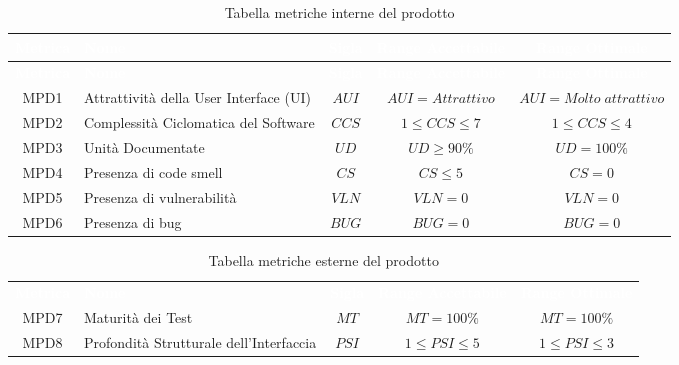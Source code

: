 \renewcommand{\arraystretch}{1.5}
\begin{longtable}{ c C{4cm} c c c}
\caption{Tabella metriche interne del prodotto}\\
\textcolor{white}{\textbf{Metrica}} & \textcolor{white}{\textbf{Nome}} & \textcolor{white}{\textbf{Sigla}} & \textcolor{white}{\textbf{Range Accettabile}} & \textcolor{white}{\textbf{Range Ottimale}}\\
\endfirsthead
{}
\textcolor{white}{\textbf{Metrica}} & \textcolor{white}{\textbf{Nome}} & \textcolor{white}{\textbf{Sigla}} & \textcolor{white}{\textbf{Range Accettabile}} & \textcolor{white}{\textbf{Range Ottimale}}\\
\endhead

    MPD1 & Attrattività della User Interface (UI) & $AUI$ & $AUI = Attrattivo$ &  $AUI = Molto \; attrattivo$\\
    MPD2 & Complessità Ciclomatica del Software & $CCS $ & $1 \leq CCS \leq 7 $ & $1 \leq CCS \leq 4$\\
    MPD3 & Unità Documentate & $UD$ & $UD \geq 90\%$ & $UD = 100\%$\\
    MPD4 & Presenza di code smell & $CS$ & $CS \leq 5 $ & $CS = 0 $\\
    MPD5 & Presenza di vulnerabilità & $VLN$ & $VLN = 0$ & $VLN = 0 $\\
    MPD6 & Presenza di bug & $BUG$ & $BUG = 0 $ & $BUG = 0 $\\
    
\end{longtable} 
\newpage
{}
\renewcommand{\arraystretch}{1.5}
\begin{longtable}{ c C{4cm} c c c}
\caption{Tabella metriche esterne del prodotto}\\
\textcolor{white}{\textbf{Metrica}} & \textcolor{white}{\textbf{Nome}} & \textcolor{white}{\textbf{Sigla}} & \textcolor{white}{\textbf{Range Accettabile}} & \textcolor{white}{\textbf{Range Ottimale}}\\
    MPD7 & Maturità dei Test & $MT$ & $MT = 100\%$ & $MT = 100\%$\\
    MPD8 & Profondità Strutturale dell'Interfaccia & $PSI$ & $1 \leq PSI \leq 5$ &$1 \leq PSI \leq 3$\\
\end{longtable}
